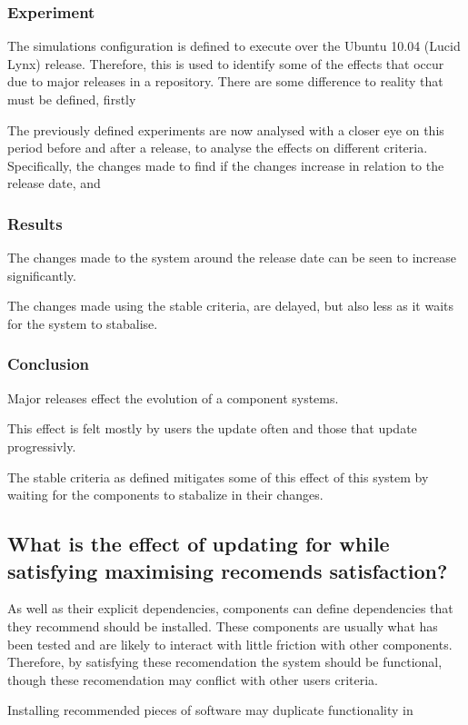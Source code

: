 \subsubsection{Experiment}
The simulations configuration is defined to execute over the Ubuntu 10.04 (Lucid Lynx) release.
Therefore, this is used to identify some of the effects that occur due to major releases in a repository.
There are some difference to reality that must be defined, firstly   

The previously defined experiments are now analysed with a closer eye on this period before and after a release, to analyse the effects on different criteria.
Specifically, the changes made to find if the changes increase in relation to the release date, and 

\subsubsection{Results}
The changes made to the system around the release date can be seen to increase significantly.

The changes made using the stable criteria, are delayed, but also less as it waits for the system to stabalise.

\subsubsection{Conclusion}
Major releases effect the evolution of a component systems.

This effect is felt mostly by users the update often and those that update progressivly.

The stable criteria as defined mitigates some of this effect of this system by waiting for the components to stabalize in their changes.

\subsection{What is the effect of updating for while satisfying maximising recomends satisfaction?}
As well as their explicit dependencies, components can define dependencies that they recommend should be installed.
These components are usually what has been tested and are likely to interact with little friction with other components.
Therefore, by satisfying these recomendation the system should be functional, though these recomendation may conflict with other users criteria.

Installing recommended pieces of software may duplicate functionality in  

